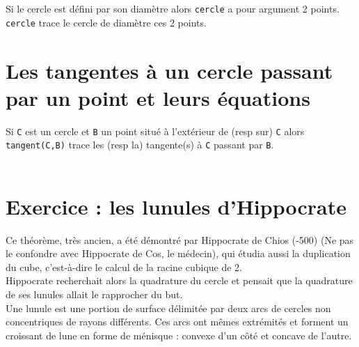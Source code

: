 \documentclass[12pt,a4paper]{book}
\begin{document}
\begin{giacjshere}
Si le cercle est d\'efini par son diam\`etre alors
{\tt cercle} a pour argument 2 points.\\
 {\tt cercle} trace le cercle de diam\`etre ces 2 points.\\

\section{Les tangentes \`a un cercle passant par un point et leurs \'equations}
Si {\tt C} est un cercle et {\tt B} un point situ\'e \`a l'ext\'erieur de
(resp sur) {\tt C} alors {\tt tangent(C,B)} trace les (resp la) tangente(s) \`a 
{\tt C} passant par {\tt B}.\\
\\
 
\section{Exercice : les lunules d'Hippocrate}
Ce th\'eorème, très ancien, a \'et\'e d\'emontr\'e par Hippocrate de Chios 
(-500) (Ne pas le confondre avec Hippocrate de Cos, le m\'edecin), qui \'etudia 
aussi la duplication du cube, c’est-à-dire le calcul de la racine cubique de 2.\\
Hippocrate recherchait alors la quadrature du cercle et pensait que la 
quadrature de ses lunules allait le rapprocher du but.\\
Une lunule est une portion de surface d\'elimit\'ee par deux arcs de cercles 
non concentriques de rayons diff\'erents. Ces arcs ont m\^emes extr\'emit\'es et
forment un croissant de lune en forme de m\'enisque : convexe d’un côt\'e et 
concave de l’autre.\\

\end{giacjshere}
\end{document}
